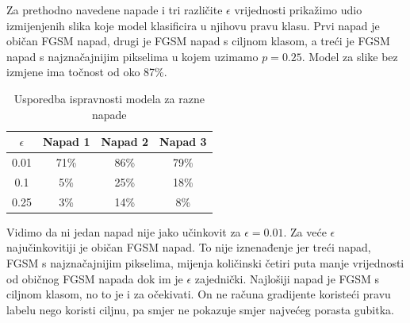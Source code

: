 Za prethodno navedene napade i tri različite $\epsilon$ vrijednosti prikažimo udio izmijenjenih slika koje model klasificira u njihovu pravu klasu. Prvi napad je običan FGSM napad, drugi je FGSM napad s ciljnom klasom, a treći je FGSM napad s najznačajnijim pikselima u kojem uzimamo $p = 0.25$. Model za slike bez izmjene ima točnost od oko 87\%.

\begin{table}[H]
	\centering
	\begin{tabular}{||c || c | c | c||} 
		\hline
		$\epsilon$ & Napad 1 & Napad 2 & Napad 3 \\ [0.5ex] 
		\hline\hline
		0.01 & 71\% & 86\% & 79\% \\ 
		0.1 & 5\% & 25\% & 18\% \\
		0.25 & 3\% & 14\% & 8\% \\ [1ex] 
		\hline
	\end{tabular}
	\caption{Usporedba ispravnosti modela za razne napade}
\end{table}

Vidimo da ni jedan napad nije jako učinkovit za $\epsilon = 0.01$. Za veće $\epsilon$ najučinkovitiji je običan FGSM napad. To nije iznenađenje jer treći napad, FGSM s najznačajnijim pikselima, mijenja količinski četiri puta manje vrijednosti od običnog FGSM napada dok im je $\epsilon$ zajednički. Najlošiji napad je FGSM s ciljnom klasom, no to je i za očekivati. On ne računa gradijente koristeći pravu labelu nego koristi ciljnu, pa smjer ne pokazuje smjer najvećeg porasta gubitka.
